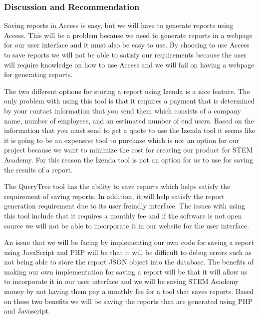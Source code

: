 \documentclass[letterpaper,10pt,serif, draftclsnofoot,onecolumn, compsoc, titlepage]{IEEEtran}
\begin{document}
\subsubsection{Discussion and Recommendation}
Saving reports in Access is easy, but we will have to generate reports using Access. This will be a problem because we need to generate reports in a webpage for our user interface and it must also be easy to use. By choosing to use Access to save reports we will not be able to satisfy our requirements because the user will require knowledge on how to use Access and we will fail on having a webpage for generating reports. 

The two different options for storing a report using Izenda is a nice feature. The only problem with using this tool is that it requires a payment that is determined by your contact information that you send them which consists of a company name, number of employees, and an estimated number of end users\cite{CostIzenda}. Based on the information that you must send to get a quote to use the Izenda tool it seems like it is going to be an expensive tool to purchase which is not an option for our project because we want to minimize the cost for creating our product for STEM Academy. For this reason the Izenda tool is not an option for us to use for saving the results of a report. 

The QueryTree tool has the ability to save reports which helps satisfy the requirement of saving reports. In addition, it will help satisfy the report generation requirement due to its user freindly interface. The issues with using this tool include that it requires a monthly fee and if the software is not open source we will not be able to incorporate it in our website for the user interface. 

An issue that we will be facing by implementing our own code for saving a report using JavaScript and PHP will be that it will be difficult to debug errors such as not being able to store the report JSON object into the database. The benefits of making our own implementation for saving a report will be that it will allow us to incorporate it in our user interface and we will be saving STEM Academy money by not having them pay a monthly fee for a tool that saves reports. Based on these two benefits we will be saving the reports that are generated using PHP and Javascript. 
\end{document}
